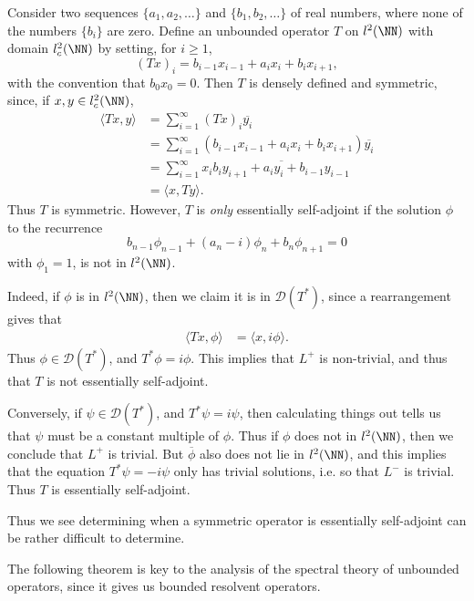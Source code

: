 \begin{example}
    Consider two sequences $\{ a_1, a_2, \dots \}$ and $\{ b_1, b_2, \dots \}$ of real numbers, where none of the numbers $\{ b_i \}$ are zero. Define an unbounded operator $T$ on $l^2(\NN)$ with domain $l^2_c(\NN)$ by setting, for $i \geq 1$,
    \[ (Tx)_i = b_{i-1}x_{i-1} + a_i x_i + b_i x_{i+1}, \]
    with the convention that $b_0x_0 = 0$. Then $T$ is densely defined and symmetric, since, if $x,y \in l^2_c(\NN)$,
    \begin{align*}
        \langle Tx, y \rangle &= \sum_{i = 1}^\infty (Tx)_i \overline{y_i}\\
        &= \sum_{i = 1}^\infty (b_{i-1} x_{i-1} + a_i x_i + b_i x_{i+1}) \overline{y_i}\\
        &= \sum_{i = 1}^\infty x_i \overline{b_i y_{i+1} + a_i y_i + b_{i-1} y_{i-1} }\\
        &= \langle x, Ty \rangle.
    \end{align*}
    Thus $T$ is symmetric. However, $T$ is \emph{only} essentially self-adjoint if the solution $\phi$ to the recurrence
    \[ b_{n-1} \phi_{n-1} + (a_n - i) \phi_n + b_n \phi_{n+1} = 0 \]
    with $\phi_1 = 1$, is not in $l^2(\NN)$.

    Indeed, if $\phi$ is in $l^2(\NN)$, then we claim it is in $\mathcal{D}(T^*)$, since a rearrangement gives that
    \begin{align*}
        \langle Tx, \phi \rangle &= \langle x, i \phi \rangle.
    \end{align*}
    Thus $\phi \in \mathcal{D}(T^*)$, and $T^* \phi = i \phi$. This implies that $L^+$ is non-trivial, and thus that $T$ is not essentially self-adjoint.

    Conversely, if $\psi \in \mathcal{D}(T^*)$, and $T^* \psi = i \psi$, then calculating things out tells us that $\psi$ must be a constant multiple of $\phi$. Thus if $\phi$ does not in $l^2(\NN)$, then we conclude that $L^+$ is trivial. But $\overline{\phi}$ also does not lie in $l^2(\NN)$, and this implies that the equation $T^* \psi = -i \psi$ only has trivial solutions, i.e. so that $L^-$ is trivial. Thus $T$ is essentially self-adjoint.

    Thus we see determining when a symmetric operator is essentially self-adjoint can be rather difficult to determine.
\end{example}

The following theorem is key to the analysis of the spectral theory of unbounded operators, since it gives us bounded resolvent operators.

